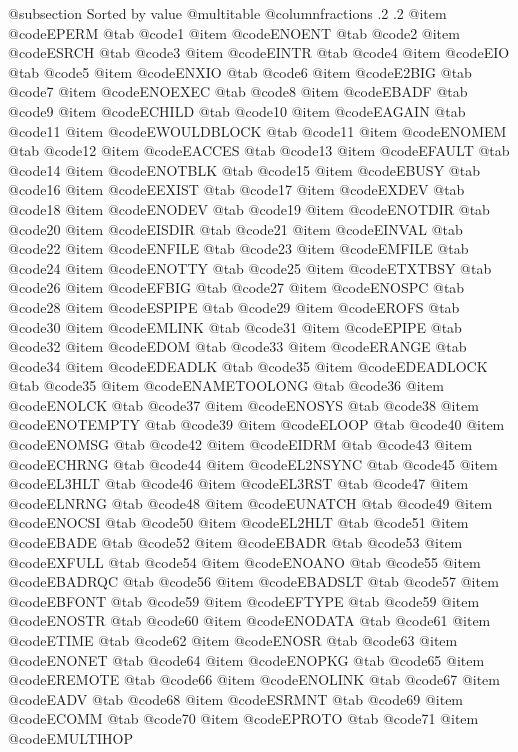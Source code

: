 @subsection Sorted by value
@multitable @columnfractions .2 .2
@item @code{EPERM}
@tab @code{1}
@item @code{ENOENT}
@tab @code{2}
@item @code{ESRCH}
@tab @code{3}
@item @code{EINTR}
@tab @code{4}
@item @code{EIO}
@tab @code{5}
@item @code{ENXIO}
@tab @code{6}
@item @code{E2BIG}
@tab @code{7}
@item @code{ENOEXEC}
@tab @code{8}
@item @code{EBADF}
@tab @code{9}
@item @code{ECHILD}
@tab @code{10}
@item @code{EAGAIN}
@tab @code{11}
@item @code{EWOULDBLOCK}
@tab @code{11}
@item @code{ENOMEM}
@tab @code{12}
@item @code{EACCES}
@tab @code{13}
@item @code{EFAULT}
@tab @code{14}
@item @code{ENOTBLK}
@tab @code{15}
@item @code{EBUSY}
@tab @code{16}
@item @code{EEXIST}
@tab @code{17}
@item @code{EXDEV}
@tab @code{18}
@item @code{ENODEV}
@tab @code{19}
@item @code{ENOTDIR}
@tab @code{20}
@item @code{EISDIR}
@tab @code{21}
@item @code{EINVAL}
@tab @code{22}
@item @code{ENFILE}
@tab @code{23}
@item @code{EMFILE}
@tab @code{24}
@item @code{ENOTTY}
@tab @code{25}
@item @code{ETXTBSY}
@tab @code{26}
@item @code{EFBIG}
@tab @code{27}
@item @code{ENOSPC}
@tab @code{28}
@item @code{ESPIPE}
@tab @code{29}
@item @code{EROFS}
@tab @code{30}
@item @code{EMLINK}
@tab @code{31}
@item @code{EPIPE}
@tab @code{32}
@item @code{EDOM}
@tab @code{33}
@item @code{ERANGE}
@tab @code{34}
@item @code{EDEADLK}
@tab @code{35}
@item @code{EDEADLOCK}
@tab @code{35}
@item @code{ENAMETOOLONG}
@tab @code{36}
@item @code{ENOLCK}
@tab @code{37}
@item @code{ENOSYS}
@tab @code{38}
@item @code{ENOTEMPTY}
@tab @code{39}
@item @code{ELOOP}
@tab @code{40}
@item @code{ENOMSG}
@tab @code{42}
@item @code{EIDRM}
@tab @code{43}
@item @code{ECHRNG}
@tab @code{44}
@item @code{EL2NSYNC}
@tab @code{45}
@item @code{EL3HLT}
@tab @code{46}
@item @code{EL3RST}
@tab @code{47}
@item @code{ELNRNG}
@tab @code{48}
@item @code{EUNATCH}
@tab @code{49}
@item @code{ENOCSI}
@tab @code{50}
@item @code{EL2HLT}
@tab @code{51}
@item @code{EBADE}
@tab @code{52}
@item @code{EBADR}
@tab @code{53}
@item @code{EXFULL}
@tab @code{54}
@item @code{ENOANO}
@tab @code{55}
@item @code{EBADRQC}
@tab @code{56}
@item @code{EBADSLT}
@tab @code{57}
@item @code{EBFONT}
@tab @code{59}
@item @code{EFTYPE}
@tab @code{59}
@item @code{ENOSTR}
@tab @code{60}
@item @code{ENODATA}
@tab @code{61}
@item @code{ETIME}
@tab @code{62}
@item @code{ENOSR}
@tab @code{63}
@item @code{ENONET}
@tab @code{64}
@item @code{ENOPKG}
@tab @code{65}
@item @code{EREMOTE}
@tab @code{66}
@item @code{ENOLINK}
@tab @code{67}
@item @code{EADV}
@tab @code{68}
@item @code{ESRMNT}
@tab @code{69}
@item @code{ECOMM}
@tab @code{70}
@item @code{EPROTO}
@tab @code{71}
@item @code{EMULTIHOP}
